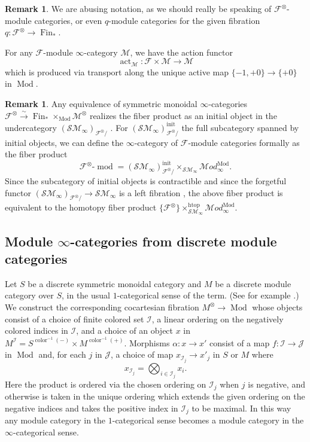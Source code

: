 \documentclass[reqno]{amsart}
\theoremstyle{definition}
\newtheorem{remark}[lemma]{Remark}
\newcommand{\mcl}[1]{\mathcal{#1}}
\newcommand{\msc}[1]{\mathscr{#1}}
\newcommand{\opn}[1]{\operatorname{#1}}
\newcommand{\ot}{\otimes}
\newcommand{\SM}{\mathscr{S}\!\!\mathscr{M}}
\DeclareMathOperator{\Fin}{Fin}
\renewcommand{\1}{\mathbf{1}}
\begin{document}
\begin{remark}
We are abusing notation, as we should really be speaking of $\msc{F}^{\ot}$-module categories, or even $q$-module categories for the given fibration $q:\msc{F}^{\ot}\to \Fin_{\ast}$.
\end{remark}

For any $\msc{F}$-module $\infty$-category $\msc{M}$, we have the action functor
\[
\opn{act}_{\msc{M}}:\msc{F}\times \msc{M}\to \msc{M}
\]
which is produced via transport along the unique active map $\{-1,+0\}\to \{+0\}$ in $\opn{Mod}$.

\begin{remark}\label{rem:3259}
Any equivalence of symmetric monoidal $\infty$-categories $\msc{F}^{\ot}\overset{\sim}\to \opn{Fin}_{\ast}\times_{\opn{Mod}}\msc{M}^{\ot}$ realizes the fiber product as an initial object in the undercategory $(\SM_{\infty})_{\msc{F}^{\ot}/}$ \cite[\href{https://kerodon.net/tag/02J2}{02J2}]{kerodon}.  For $(\SM_{\infty})_{\msc{F}^{\ot}/}^{\opn{init}}$ the full subcategory spanned by initial objects, we can define the $\infty$-category of $\msc{F}$-module categories formally as the fiber product
\[
\msc{F}^{\ot}\text{-}\opn{mod}=(\SM_{\infty})^{\opn{init}}_{\msc{F}^{\ot}/}\times_{\SM_{\infty}}\msc{M}\!od^{\opn{Mod}}_{\infty}.
\]
Since the subcategory of initial objects is contractible \cite[\href{https://kerodon.net/tag/02HM}{02HM}]{kerodon} and since the forgetful functor $(\SM_{\infty})_{\msc{F}^{\ot}/}\to \SM_{\infty}$ is a left fibration \cite{joyal02} \cite[\href{https://kerodon.net/tag/018F}{018F}]{kerodon}, the above fiber product is equivalent to the homotopy fiber product $\{\msc{F}^{\ot}\}\times^{\opn{htop}}_{\SM_{\infty}}\msc{M}\!od^{\opn{Mod}}_{\infty}$.
\end{remark}


\subsection{Module $\infty$-categories from discrete module categories}

Let $S$ be a discrete symmetric monoidal category and $M$ be a discrete module category over $S$, in the usual $1$-categorical sense of the term.  (See for example \cite[Definition 7.1.1]{egno15}.)  We construct the corresponding cocartesian fibration $M^{\ot}\to \opn{Mod}$ whose objects consist of a choice of finite colored set $\mcl{I}$, a linear ordering on the negatively colored indices in $\mcl{I}$, and a choice of an object $x$ in $M^{\mcl{I}}=S^{\opn{color}^{-1}(-)}\times M^{\opn{color}^{-1}(+)}$.  Morphisms $\alpha:x\to x'$ consist of a map $f:\mcl{I}\to \mcl{J}$ in $\opn{Mod}$ and, for each $j$ in $\mcl{J}$, a choice of map $x_{\mcl{I}_j}\to x'_j$ in $S$ or $M$ where
\[
x_{\mcl{I}_j}=\bigotimes_{i\in \mcl{I}_j}x_i.
\]
Here the product is ordered via the chosen ordering on $\mcl{I}_j$ when $j$ is negative, and otherwise is taken in the unique ordering which extends the given ordering on the negative indices and takes the positive index in $\mcl{I}_j$ to be maximal.  In this way any module category in the $1$-categorical sense becomes a module category in the $\infty$-categorical sense.
\end{document}
